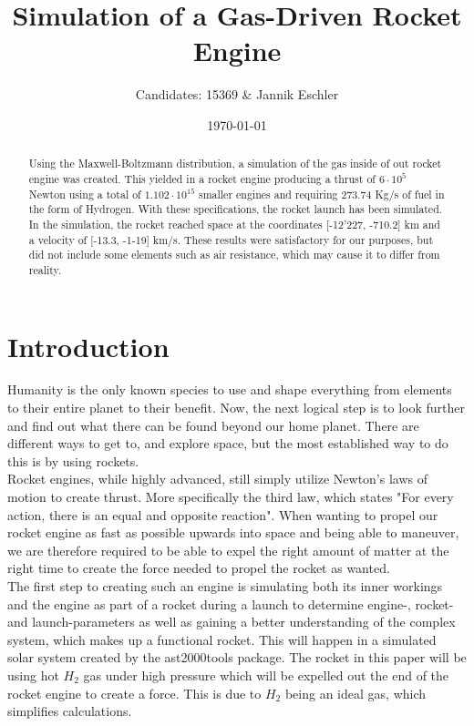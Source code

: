 \documentclass[reprint,english,notitlepage]{revtex4-2}
\begin{document}
\title{Simulation of a Gas-Driven Rocket Engine}
\author{Candidates: 15369 \& Jannik Eschler}
\date{\today}

\begin{abstract}
	Using the Maxwell-Boltzmann distribution, a simulation of the gas inside of out rocket engine was created.
	This yielded in a rocket engine producing a thrust of $6 \cdot 10^{5}$ Newton using a total of $1.102 \cdot 10^{15}$ smaller engines and requiring $273.74$ Kg/s of fuel in the form of Hydrogen.
	With these specifications, the rocket launch has been simulated.
	In the simulation, the rocket reached space at the coordinates [-12'227, -710.2] km and a velocity of [-13.3, -1-19] km/s.
	These results were satisfactory for our purposes, but did not include some elements such as air resistance, which may cause it to differ from reality.

\end{abstract}
\maketitle

\section{Introduction}
Humanity is the only known species to use and shape everything from elements to their entire planet to their benefit.
Now, the next logical step is to look further and find out what there can be found beyond our home planet.
There are different ways to get to, and explore space, but the most established way to do this is by using rockets.\\
Rocket engines, while highly advanced, still simply utilize Newton's laws of motion to create thrust.
More specifically the third law, which states "For every action, there is an equal and opposite reaction".
When wanting to propel our rocket engine as fast as possible upwards into space and being able to maneuver, we are therefore required
to be able to expel the right amount of matter at the right time to create the force needed to propel the rocket as wanted.\\
The first step to creating such an engine is simulating both its inner workings and the engine as part of a rocket during a launch to determine engine-, rocket- and launch-parameters
as well as gaining a better understanding of the complex system, which makes up a functional rocket. This will happen in a simulated solar system created by the ast2000tools package.
The rocket in this paper will be using hot $ H_2 $ gas under high pressure which will be expelled out the end of the rocket engine to create a force.
This is due to $H_2$ being an ideal gas, which simplifies calculations.
\end{document}
